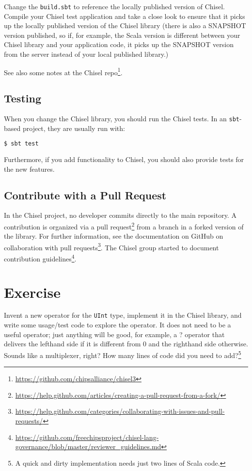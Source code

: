 \documentclass[%
    10pt,
    headinclude, footexclude,
    openright, %
    notitlepage,
    cleardoubleempty,
    headsepline,
    pointlessnumbers,
    bibtotoc, idxtotoc,
    ]{scrbook}
\newcommand{\code}[1]{{\lstinline[basicstyle=\small\ttfamily]{#1}}}
\newcommand{\myref}[2]{\href{#1}{#2}}
\renewcommand{\myref}[2]{{#2}{\footnote{\url{#1}}}}
\begin{document}
Change the \code{build.sbt} to reference the locally published version of Chisel.
Compile your Chisel test application and take a close look to ensure that it picks up the locally published
version of the Chisel library (there is also a SNAPSHOT version published, so if, for example,
the Scala version is different between your Chisel library and your application code,
it picks up the SNAPSHOT version from the server instead of your local published
library.)

See also \myref{https://github.com/chipsalliance/chisel3}{some notes
at the Chisel repo}.

\subsection{Testing}

When you change the Chisel library, you should run the Chisel tests.
In an \code{sbt}-based project, they are usually run with:

\begin{verbatim}
$ sbt test
\end{verbatim}

Furthermore, if you add functionality to Chisel, you should also provide tests for the
new features.

\subsection{Contribute with a Pull Request}

In the Chisel project, no developer commits directly to the main repository.
A contribution is organized via a
\myref{https://help.github.com/articles/creating-a-pull-request-from-a-fork/}{pull request}
from a branch in a forked version of the library.
For further information, see the documentation on GitHub on
\myref{https://help.github.com/categories/collaborating-with-issues-and-pull-requests/}{collaboration with
pull requests}.
The Chisel group started to document
\myref{https://github.com/freechipsproject/chisel-lang-governance/blob/master/reviewer_guidelines.md}{contribution
guidelines}.

\section{Exercise}

Invent a new operator for the \code{UInt} type, implement it in the Chisel library,
and write some usage/test code to explore the operator. It does not need to be
a useful operator; just anything will be good, for example, a ? operator that delivers the lefthand side
if it is different from 0 and the righthand side otherwise. Sounds like a multiplexer, right?
How many lines of code did you need to add?\footnote{A quick and dirty implementation
needs just two lines of Scala code.}
\end{document}
